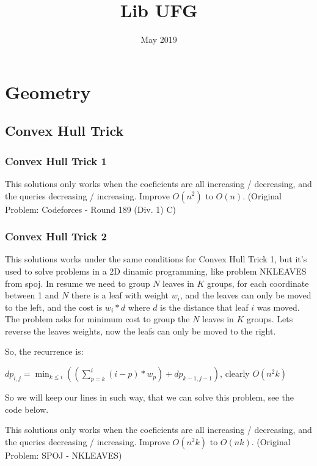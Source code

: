 \documentclass{report}
\title{Lib UFG}
\date{May 2019}
\newcommand{\RomanNumeralCaps}[1]
    {\MakeUppercase{\romannumeral #1}}
\begin{document}
\maketitle
 
 
\tableofcontents{}
    \chapter{Geometry \RomanNumeralCaps{8}}
    \section{Convex Hull Trick}
        \subsection{Convex Hull Trick 1}
        This solutions only works when the coeficients are all increasing / decreasing, and the queries decreasing / increasing. Improve $O(n^2)$ to $O(n)$. (Original Problem: Codeforces - Round 189 (Div. 1) C)
        
        \subsection{Convex Hull Trick 2}
        This solutions works under the same conditions for Convex Hull Trick 1, but it's used to solve problems in a 2D dinamic programming, like problem NKLEAVES from spoj. In resume we need to group $N$ leaves in $K$ groups, for each coordinate between 1 and $N$ there is a leaf with weight $w_i$, and the leaves can only be moved to the left, and the cost is $w_i * d$ where $d$ is the distance that leaf $i$ was moved. The problem asks for minimum cost to group the $N$ leaves in $K$ groups. Lets reverse the leaves weights, now the leafs can only be moved to the right.
        
        So, the recurrence is:
        
        \bigskip
        
        $dp_{i, j} = \min_{k \leq i} ( (\sum_{p=k}^{i} (i - p) * w_p) + dp_{k - 1, j - 1})$, clearly $O(n^2k)$
        
        \bigskip
        
        So we will keep our lines in such way, that we can solve this problem, see the code below. 
        
        This solutions only works when the coeficients are all increasing / decreasing, and the queries decreasing / increasing. Improve $O(n^2k)$ to $O(nk)$. (Original Problem: SPOJ - NKLEAVES)
        
\end{document}
